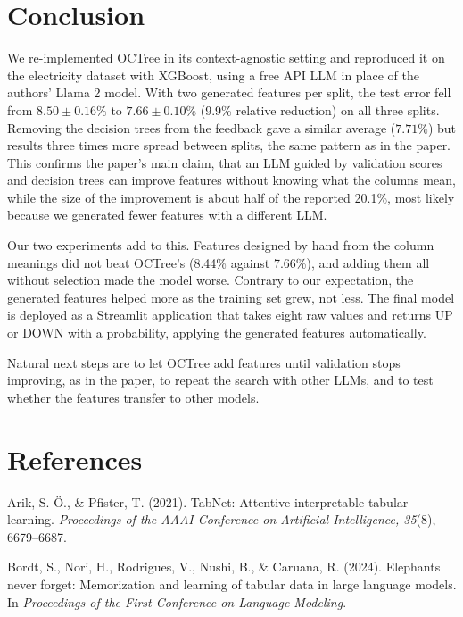 \documentclass[11pt]{article}
\begin{document}
\section{Conclusion}\label{sec:conclusion}
We re-implemented OCTree in its context-agnostic setting and reproduced it on the electricity
dataset with XGBoost, using a free API LLM in place of the authors' Llama 2 model. With two generated
features per split, the test error fell from $8.50\pm0.16\%$ to $7.66\pm0.10\%$ (9.9\% relative
reduction) on all three splits. Removing the decision trees from the feedback gave a similar
average ($7.71\%$) but results three times more spread between splits, the same pattern as in the
paper. This confirms the paper's main claim, that an LLM guided by validation
scores and decision trees can improve features without knowing what the columns mean, while the size
of the improvement is about half of the reported 20.1\%, most likely because we generated fewer
features with a different LLM.

Our two experiments add to this. Features designed by hand from the column meanings did not beat
OCTree's (8.44\% against 7.66\%), and adding them all without selection made the model worse. Contrary
to our expectation, the generated features helped more as the training set grew, not less. The
final model is deployed as a Streamlit application that takes eight raw values and returns UP or DOWN
with a probability, applying the generated features automatically.

Natural next steps are to let OCTree add features until validation stops improving, as in the
paper, to repeat the search with other LLMs, and to test whether the features transfer to other
models.

\clearpage
\section{References}\label{sec:refs}
\small
\raggedright
\setlength{\parskip}{4pt}
\setlength{\parindent}{-0.5in}
\setlength{\leftskip}{0.5in}

Arik, S. Ö., \& Pfister, T. (2021). TabNet: Attentive interpretable tabular learning.
\emph{Proceedings of the AAAI Conference on Artificial Intelligence, 35}(8), 6679--6687.

Bordt, S., Nori, H., Rodrigues, V., Nushi, B., \& Caruana, R. (2024). Elephants never forget:
Memorization and learning of tabular data in large language models. In \emph{Proceedings of the First
Conference on Language Modeling}.
\end{document}
